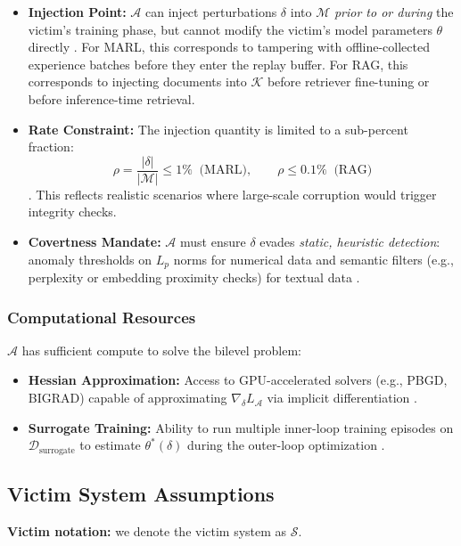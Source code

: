 \documentclass[conference]{IEEEtran}
\begin{document}
\begin{itemize}
\item \textbf{Injection Point:} $\mathcal{A}$ can inject perturbations $\delta$ into $\mathcal{M}$ \textit{prior to or during} the victim's training phase, but cannot modify the victim's model parameters $\theta$ directly \cite{Ref13, Ref25}. For MARL, this corresponds to tampering with offline-collected experience batches before they enter the replay buffer. For RAG, this corresponds to injecting documents into $\mathcal{K}$ before retriever fine-tuning or before inference-time retrieval.
\item \textbf{Rate Constraint:} The injection quantity is limited to a sub-percent fraction:
\[
\rho = \frac{|\delta|}{|\mathcal{M}|} \le 1\% \;\; \text{(MARL)}, \qquad \rho \le 0.1\% \;\; \text{(RAG)}
\]
\cite{Ref7, Ref13}. This reflects realistic scenarios where large-scale corruption would trigger integrity checks.
\item \textbf{Covertness Mandate:} $\mathcal{A}$ must ensure $\delta$ evades \textit{static, heuristic detection}: anomaly thresholds on $L_p$ norms for numerical data \cite{Ref24} and semantic filters (e.g., perplexity or embedding proximity checks) for textual data \cite{Ref29, Ref37}.
\end{itemize}

\subsubsection{Computational Resources}
$\mathcal{A}$ has sufficient compute to solve the bilevel problem:

\begin{itemize}
\item \textbf{Hessian Approximation:} Access to GPU-accelerated solvers (e.g., PBGD, BIGRAD) capable of approximating $\nabla_{\delta} L_{\mathcal{A}}$ via implicit differentiation \cite{Ref21, Ref23}.
\item \textbf{Surrogate Training:} Ability to run multiple inner-loop training episodes on $\mathcal{D}_{\text{surrogate}}$ to estimate $\theta^*(\delta)$ during the outer-loop optimization \cite{Ref20, Ref25}.
\end{itemize}

\subsection{Victim System Assumptions}
\textbf{Victim notation:} we denote the victim system as $\mathcal{S}$.
\end{document}
